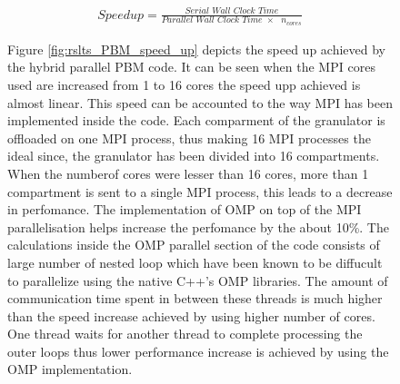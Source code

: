 \documentclass[preprint,11pt,authoryear]{elsarticle}
\begin{document}
\begin{align}
\textit{Speedup} = \frac{\textit{Serial Wall Clock Time}}{\textit{Parallel Wall Clock Time $\times$ $n_{cores}$}}
\label{eqn:rslts_PBM_parallel_efficiency}
\end{align}
\begin{figure}[H]
Figure \ref{fig:rslts_PBM_speed_up} depicts the speed up achieved by the hybrid parallel PBM code. It can be seen when the MPI cores used are increased from 1 to 16 cores the speed upp achieved is almost linear. This speed can be accounted to the way MPI has been implemented inside the code. Each comparment of the granulator is  offloaded on one MPI process, thus making 16 MPI processes the ideal since, the granulator has been divided into 16 compartments. When the numberof cores were lesser than 16 cores, more than 1 compartment is sent to a single MPI process, this leads to a decrease in perfomance. The implementation of OMP on top of the MPI parallelisation helps increase the perfomance by the about 10\%. The calculations inside the OMP parallel section of the code consists of large number of nested loop which have been known to be diffucult to parallelize \citep{He2016} using the native C++'s OMP libraries. The amount of communication time spent in between these threads is much higher than the speed increase achieved by using higher number of cores. One thread waits for another thread to complete processing the outer loops thus lower performance increase is achieved by using the OMP implementation. \\


\end{figure}
\end{document}

